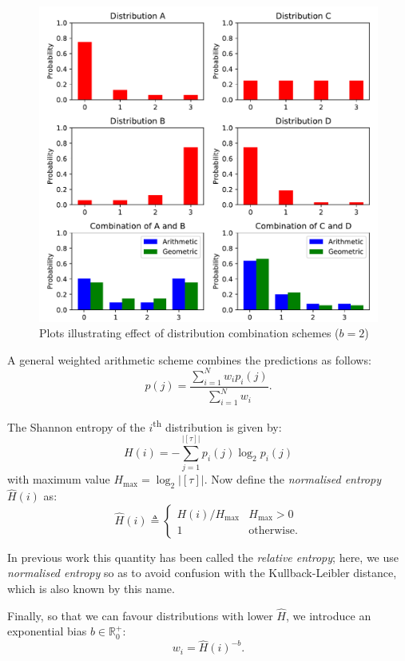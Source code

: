 \documentclass[12pt,a4paper,twoside,openright]{report}
\begin{document}
\begin{figure}[H]
\centering
\includegraphics[width=400pt]{figs/dist_comb.pdf}
\caption{Plots illustrating effect of distribution combination schemes ($b = 2$)}
\label{fig:dist-comb-plot}
\end{figure}

A general weighted arithmetic scheme combines the predictions as follows:
$$
  p(j) = \frac{ \sum_{i = 1}^N w_i p_i(j) }{ \sum_{i = 1}^N w_i }.
$$

The Shannon entropy of the $i$\textsuperscript{th} distribution is given by:
$$ H(i) = - \sum_{j = 1}^{|[\tau]|} p_i(j) \log_2 p_i(j) $$
with maximum value $H_{\mathrm{max}} = \log_2{ |[\tau]| }$. Now define the
\emph{normalised entropy} $\hat{H}(i)$ as:
$$ \hat{H}(i) \triangleq \begin{cases}
  H(i)/H_{\mathrm{max}} & H_{\mathrm{max}} > 0 \\
  1 & \text{otherwise.}
\end{cases} $$

In previous work this quantity has been called the \emph{relative entropy};
here, we use \emph{normalised entropy} so as to avoid confusion with the
Kullback-Leibler distance, which is also known by this name.

Finally, so that we can favour distributions with lower $\hat{H}$, we introduce
an exponential bias $b \in \mathbb{R}_0^+$:
$$ w_i = \hat{H}(i)^{-b}. $$
\end{document}
